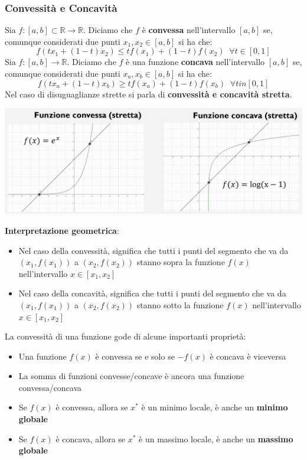 \documentclass[12pt]{article}
\begin{document}
\subsubsection{Convessità e Concavità}
Sia $f:[a,b] \subset \mathbb{R} \rightarrow \mathbb{R}$. Diciamo che $f$ è \textbf{convessa} nell'intervallo $[a,b]$ se, comunque considerati
due punti $x_1,x_2 \in [a,b]$ si ha che:
$$f(tx_1 + (1-t)x_2) \leq tf(x_1)+(1-t)f(x_2) \; \; \forall t \in [0,1]$$
Sia $f:[a,b] \rightarrow \mathbb{R}$. Diciamo che $f$ è una funzione \textbf{concava} nell'intervallo $[a,b]$ se, comunque
considerati due punti $x_a, x_b \in [a,b]$ si ha che:
$$f(tx_a + (1-t)x_b) \geq tf(x_a) + (1-t)f(x_b) \; \; \forall t in [0,1]$$
Nel caso di disuguaglianze strette si parla di \textbf{convessità e concavità stretta}.
\begin{center}
    \includegraphics[width = 1\linewidth]{Images/90.png}
\end{center}
\textbf{Interpretazione geometrica}:
\begin{itemize}
    \item Nel caso della convessità, significa che tutti i punti del segmento che va da $(x_1, f(x_1))$ a $(x_2, f(x_2))$ stanno sopra la funzione $f(x)$ nell'intervallo $x \in [x_1,x_2]$
    \item Nel caso della concavità, significa che tutti i punti del segmento che va da $(x_1, f(x_1))$ a $(x_2, f(x_2))$ stanno sotto la funzione $f(x)$ nell'intervallo $x \in [x_1,x_2]$
\end{itemize}
La convessità di una funzione gode di alcune importanti proprietà:
\begin{itemize}
    \item Una funzione $f(x)$ è convessa se e solo se $-f(x)$ è concava è viceversa
    \item La somma di funzioni convesse/concave è ancora una funzione convessa/concava
    \item Se $f(x)$ è convessa, allora se $x^*$ è un minimo locale, è anche un \textbf{minimo globale}
    \item Se $f(x)$ è concava, allora se $x^*$ è un massimo locale, è anche un \textbf{massimo globale}
\end{itemize}
\end{document}
